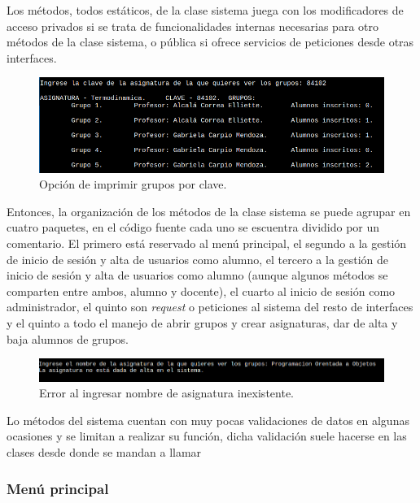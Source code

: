\documentclass[a4paper,12pt]{article}
\begin{document}
Los métodos, todos estáticos, de la clase sistema juega con los modificadores de acceso privados si se trata de funcionalidades internas necesarias para otro métodos de la clase sistema, o pública si ofrece servicios de peticiones desde otras interfaces.

\begin{figure}[ht]
    \centering
    \includegraphics[width=.9\textwidth]{media/grupos_por_clave.png}
    \caption{Opción de imprimir grupos por clave.}
    \label{fig:gruposxclave}
\end{figure}

Entonces, la organización de los métodos de la clase sistema se puede agrupar en cuatro paquetes, en el código fuente cada uno se escuentra dividido por un comentario. El primero está reservado al menú principal, el segundo a la gestión de inicio de sesión y alta de usuarios como alumno, el tercero a la gestión de inicio de sesión y alta de usuarios como alumno (aunque algunos métodos se comparten entre ambos, alumno y docente), el cuarto al inicio de sesión como administrador, el quinto son \textit{request} o peticiones al sistema del resto de interfaces y el quinto a todo el manejo de abrir grupos y crear asignaturas, dar de alta y baja alumnos de grupos.\\

\begin{figure}[ht]
    \centering
    \includegraphics[width=.9\textwidth]{media/grupos_por_nombre_mal.png}
    \caption{Error al ingresar nombre de asignatura inexistente.}
    \label{fig:err2}
\end{figure}

Lo métodos del sistema cuentan con muy pocas validaciones de datos en algunas ocasiones y se limitan a realizar su función, dicha validación suele hacerse en las clases desde donde se mandan a llamar

\subsubsection{Menú principal}
\end{document}
